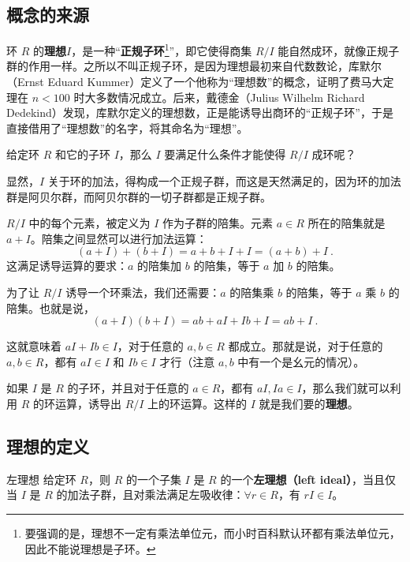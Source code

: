 
\subsection{概念的来源}

环 $R$ 的\textbf{理想}$I$，是一种“\textbf{正规子环}\footnote{要强调的是，理想不一定有乘法单位元，而小时百科默认环都有乘法单位元，因此不能说理想是子环。}”，即它使得商集 $R/I$ 能自然成环，就像正规子群的作用一样。之所以不叫正规子环，是因为理想最初来自代数数论，库默尔（Ernst Eduard Kummer）定义了一个他称为“理想数”的概念，证明了费马大定理在 $n<100$ 时大多数情况成立。后来，戴德金（Julius Wilhelm Richard Dedekind）发现，库默尔定义的理想数，正是能诱导出商环的“正规子环”，于是直接借用了“理想数”的名字，将其命名为“理想”。

给定环 $R$ 和它的子环 $I$，那么 $I$ 要满足什么条件才能使得 $R/I$ 成环呢？

显然，$I$ 关于环的加法，得构成一个正规子群，而这是天然满足的，因为环的加法群是阿贝尔群，而阿贝尔群的一切子群都是正规子群。

$R/I$ 中的每个元素，被定义为 $I$ 作为子群的陪集。元素 $a\in R$ 所在的陪集就是 $a+I$。陪集之间显然可以进行加法运算：
\begin{equation}
(a+I)+(b+I)=a+b+I+I=(a+b)+I~.
\end{equation}
这满足诱导运算的要求：$a$ 的陪集加 $b$ 的陪集，等于 $a$ 加 $b$ 的陪集。

为了让 $R/I$ 诱导一个环乘法，我们还需要：$a$ 的陪集乘 $b$ 的陪集，等于 $a$ 乘 $b$ 的陪集。也就是说，
\begin{equation}
(a+I)(b+I)=ab+aI+Ib+I=ab+I~.
\end{equation}

这就意味着 $aI+Ib\in I$，对于任意的 $a, b\in R$ 都成立。那就是说，对于任意的 $a, b\in R$，都有 $aI\in I$ 和 $Ib\in I$ 才行（注意 $a, b$ 中有一个是幺元的情况）。

如果 $I$ 是 $R$ 的子环，并且对于任意的 $a\in R$，都有 $aI, Ia\in I$，那么我们就可以利用 $R$ 的环运算，诱导出 $R/I$ 上的环运算。这样的 $I$ 就是我们要的\textbf{理想}。

\subsection{理想的定义}

\begin{definition}{左理想}
给定环 $R$，则 $R$ 的一个子集 $I$ 是 $R$ 的一个\textbf{左理想（left ideal）}，当且仅当 $I$ 是 $R$ 的加法子群，且对乘法满足左吸收律：$\forall r\in R$，有 $rI\in I$。
\end{definition}

